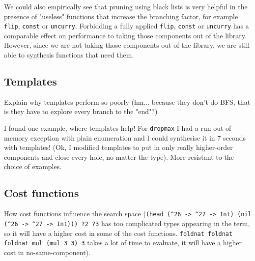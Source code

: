 We could also empirically see that pruning using black lists is very helpful in the presence of "useless" functions that increase the branching factor, for example \lstinline?flip?, \lstinline?const? or \lstinline?uncurry?. Forbidding a fully applied \lstinline?flip?, \lstinline?const? or \lstinline?uncurry? has a comparable effect on performance to taking those components out of the library. However, since we are not taking those components out of the library, we are still able to synthesis functions that need them.

\subsection{Templates}
Explain why templates perform so poorly (hm... because they don't do BFS, that is they have to explore every branch to the "end"?)

I found one example, where templates help! For \lstinline?dropmax? I had a run out of memory exception with plain enumeration and I could synthesise it in 7 seconds with templates!
(Ok, I modified templates to put in only really higher-order components and close every hole, no matter the type). More resistant to the choice of examples.

\subsection{Cost functions}
How cost functions influence the search space (\lstinline!(head (^26 -> ^27 -> Int) (nil (^26 -> ^27 -> Int))) ?2 ?3! has too complicated types appearing in the term, so it will have a higher cost in some of the cost functions. \lstinline!foldnat foldnat foldnat mul (mul 3 3) 3! takes a lot of time to evaluate, it will have a higher cost in no-same-component).

